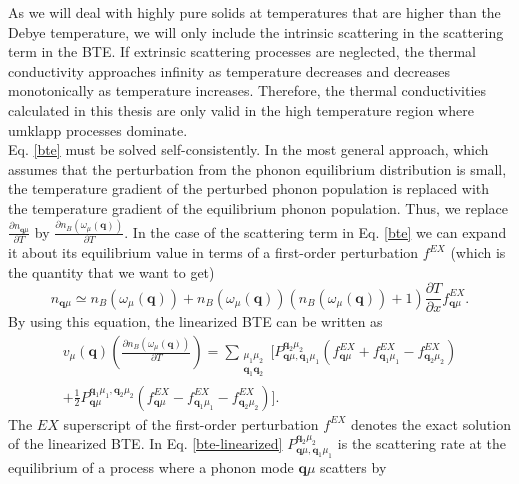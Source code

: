 As we will deal with highly pure solids at temperatures that are higher than the Debye temperature, we will only 
include the intrinsic scattering in the scattering term in the BTE. If extrinsic scattering processes are neglected, 
the thermal conductivity approaches infinity as temperature decreases and decreases monotonically as temperature 
increases. Therefore, the thermal conductivities calculated in this thesis are only valid in the high temperature 
region where umklapp processes dominate. \\

Eq. \ref{bte} must be solved self-consistently. In the most general approach\cite{ziman2001electrons}, which assumes 
that the perturbation from the phonon equilibrium distribution is small, the temperature gradient of the perturbed phonon population is replaced with the temperature gradient of the equilibrium phonon population. Thus, we replace $\frac{\partial n_{\mathbf{q}\mu}}{\partial T}$ by $\frac{\partial n_{B}(\omega_{\mu}(\mathbf{
q}))}{\partial T}$. In the case of the scattering term in Eq. \ref{bte} we can expand it about its equilibrium value in terms of a first-order perturbation $f^{EX}$ (which is the quantity that we want to get)
\begin{equation}
 n_{\mathbf{q}\mu}\simeq n_{B}(\omega_{\mu}(\mathbf{q}))+n_{B}(\omega_{\mu}(\mathbf{q}))(n_{B}(\omega_{\mu}(\mathbf{q}))+1)\frac{\partial T}{\partial x}f^{EX}_{\mathbf{q}\mu}.
\end{equation} 
By using this equation, the linearized BTE can be written as\cite{sparavigna2002lattice}
\begin{multline}
 \label{bte-linearized}
 v_{\mu}(\mathbf{q})\left(\frac{\partial n_{B}(\omega_{\mu}(\mathbf{q}))}{\partial T}\right)=\sum\limits_{\substack{\mu_{1}\mu_{2} \\ \mathbf{q}_{1}\mathbf{q}_{2}}}
 [P_{\mathbf{q}\mu,\mathbf{q}_{1}\mu_{1}}^{\mathbf{q}_{2}\mu_{2}}(f_{\mathbf{q}\mu}^{EX}+f_{\mathbf{q}_{1}\mu_{1}}^{EX}-f_{\mathbf{q}_{2}\mu_{2}}^{EX}) \\ 
 +\frac{1}{2}P_{\mathbf{q}\mu}^{\mathbf{q}_{1}\mu_{1},\mathbf{q}_{2}\mu_{2}}(f_{\mathbf{q}\mu}^{EX}-f_{\mathbf{q}_{1}\mu_{1}}^{EX}-f_{\mathbf{q}_{2}\mu_{2}}^{EX})].
\end{multline}
The $EX$ superscript of the first-order perturbation $f^{EX}$ denotes the exact solution of the linearized BTE. 
In Eq. \ref{bte-linearized} $P_{\mathbf{q}\mu,\mathbf{q}_{1}\mu_{1}}^{\mathbf{q}_{2}\mu_{2}}$ is the scattering rate at the equilibrium of a process where a phonon mode $\mathbf{q}\mu$ scatters by 
